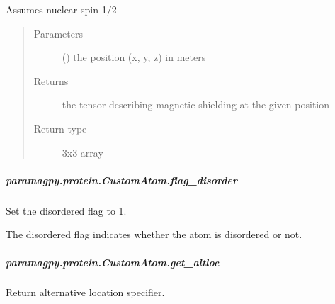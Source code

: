 \documentclass[a4paper,10pt,english]{sphinxmanual}
\begin{document}
\begin{fulllineitems}
\begin{fulllineitems}
\begin{fulllineitems}
Assumes nuclear spin 1/2
\begin{quote}\begin{description}
\item[{Parameters}] \leavevmode
{} () \textendash{} the position (x, y, z) in meters

\item[{Returns}] \leavevmode
{} \textendash{} the tensor describing magnetic shielding at the given position

\item[{Return type}] \leavevmode
3x3 array

\end{description}\end{quote}

\end{fulllineitems}



\subparagraph{paramagpy.protein.CustomAtom.flag\_disorder}
\label{\detokenize{reference/generated/paramagpy.protein.CustomAtom.flag_disorder:paramagpy-protein-customatom-flag-disorder}}\label{\detokenize{reference/generated/paramagpy.protein.CustomAtom.flag_disorder::doc}}

\begin{fulllineitems}
\label{\detokenize{reference/generated/paramagpy.protein.CustomAtom.flag_disorder:paramagpy.protein.CustomAtom.flag_disorder}}
Set the disordered flag to 1.

The disordered flag indicates whether the atom is disordered or not.

\end{fulllineitems}



\subparagraph{paramagpy.protein.CustomAtom.get\_altloc}
\label{\detokenize{reference/generated/paramagpy.protein.CustomAtom.get_altloc:paramagpy-protein-customatom-get-altloc}}\label{\detokenize{reference/generated/paramagpy.protein.CustomAtom.get_altloc::doc}}

\begin{fulllineitems}
\label{\detokenize{reference/generated/paramagpy.protein.CustomAtom.get_altloc:paramagpy.protein.CustomAtom.get_altloc}}
Return alternative location specifier.


\end{fulllineitems}
\end{fulllineitems}
\end{fulllineitems}
\end{document}
